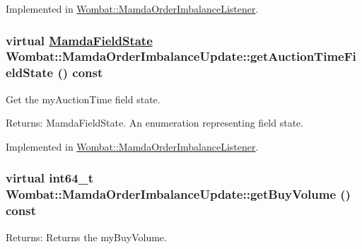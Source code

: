 Implemented in \hyperlink{classWombat_1_1MamdaOrderImbalanceListener_ce6a5772582fd4c526fbce36f1edee13}{Wombat::Mamda\-Order\-Imbalance\-Listener}.\hypertarget{classWombat_1_1MamdaOrderImbalanceUpdate_9ac67d6cd236c9fdecd04e9981ff2682}{
\subsubsection[getAuctionTimeFieldState]{\setlength{\rightskip}{0pt plus 5cm}virtual \hyperlink{namespaceWombat_93aac974f2ab713554fd12a1fa3b7d2a}{Mamda\-Field\-State} Wombat::Mamda\-Order\-Imbalance\-Update::get\-Auction\-Time\-Field\-State () const}}
\label{classWombat_1_1MamdaOrderImbalanceUpdate_9ac67d6cd236c9fdecd04e9981ff2682}


Get the my\-Auction\-Time field state. 

\begin{Desc}
\item[Returns:]Mamda\-Field\-State. An enumeration representing field state. \end{Desc}


Implemented in \hyperlink{classWombat_1_1MamdaOrderImbalanceListener_34beab82ba1bcb31a0a67df3fd9fa4bd}{Wombat::Mamda\-Order\-Imbalance\-Listener}.\hypertarget{classWombat_1_1MamdaOrderImbalanceUpdate_cbe7dfec973260c56da5da281bcdcac4}{
\subsubsection[getBuyVolume]{\setlength{\rightskip}{0pt plus 5cm}virtual int64\_\-t Wombat::Mamda\-Order\-Imbalance\-Update::get\-Buy\-Volume () const}}
\label{classWombat_1_1MamdaOrderImbalanceUpdate_cbe7dfec973260c56da5da281bcdcac4}


\begin{Desc}
\item[Returns:]Returns the my\-Buy\-Volume. \end{Desc}


